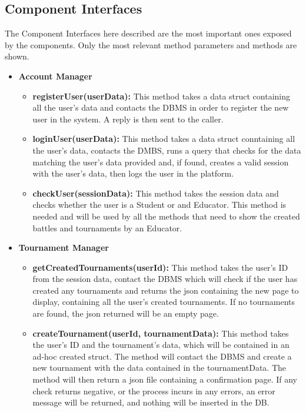 \documentclass{article}
\begin{document}
{\subsection{Component Interfaces}
The Component Interfaces here described are the most important ones exposed by the components.
Only the most relevant method parameters and methods are shown.
\begin{itemize}
\item \textbf{Account Manager}
    \begin{itemize}
        \item \textbf{registerUser(userData):} This method takes a data struct containing all the user's data and contacts the DBMS in order to 
        register the new user in the system. A reply is then sent to the caller.
        \item \textbf{loginUser(userData):} This method takes a data struct conntaining all the user's data, contacts the DMBS, runs a query that checks
        for the data matching the user's data provided and, if found, creates a valid session with the user's data, then logs the user in the platform.
        \item \textbf{checkUser(sessionData):} This method takes the session data and checks whether the user is a Student or and Educator.
        This method is needed and will be used by all the methods that need to show the created battles and tournaments by an Educator.
    \end{itemize}
    \item \textbf{Tournament Manager}
    \begin{itemize}
        \item \textbf{getCreatedTournaments(userId):} This method takes the user's ID from the session data, contact the DBMS which will check 
        if the user has created any tournaments and returns the json containing the new page to display, containing all the user's created tournaments.
        If no tournaments are found, the json returned will be an empty page.
        \item \textbf{createTournament(userId, tournamentData):} This method takes the user's ID and the tournament's data, which will be contained in an ad-hoc
        created struct. The method will contact the DBMS and create a new tournament with the data contained in the tournamentData. 
        The method will then return a json file containing a confirmation page.
        If any check returns negative, or the process incurs in any errors, an error message will be returned, and nothing will be inserted in the DB.

\end{itemize}
\end{itemize}}
\end{document}
